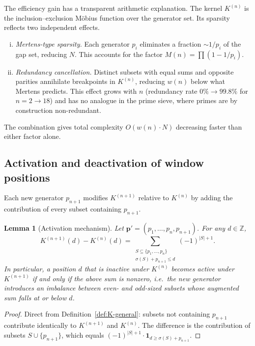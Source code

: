 \documentclass[11pt,a4paper]{amsart}
\theoremstyle{plain}
\newtheorem{lemma}[theorem]{Lemma}
\theoremstyle{definition}
\theoremstyle{remark}
\begin{document}
The efficiency gain has a transparent arithmetic explanation.
The kernel $K^{(n)}$ is the inclusion--exclusion M\"{o}bius function
over the generator set. Its sparsity reflects two independent effects.

\begin{enumerate}[(i)]
\item \emph{Mertens-type sparsity.} Each generator $p_i$ eliminates
a fraction $\sim 1/p_i$ of the gap set, reducing $N$.
This accounts for the factor $M(n) = \prod(1 - 1/p_i)$.

\item \emph{Redundancy cancellation.} Distinct subsets with equal sums
and opposite parities annihilate breakpoints in $K^{(n)}$,
reducing $w(n)$ below what Mertens predicts. This effect grows
with $n$ (redundancy rate $0\% \to 99.8\%$ for $n = 2 \to 18$)
and has no analogue in the prime sieve, where primes are by
construction non-redundant.
\end{enumerate}

The combination gives total complexity $O(w(n) \cdot N)$ decreasing
faster than either factor alone.

\subsection{Activation and deactivation of window positions}

Each new generator $p_{n+1}$ modifies $K^{(n+1)}$ relative to $K^{(n)}$
by adding the contribution of every subset containing $p_{n+1}$.

\begin{lemma}[Activation mechanism]
\label{lem:activation}
Let $\mathbf{p}' = (p_1,\ldots,p_n,p_{n+1})$.
For any $d \in \mathbb{Z}$,
\[
  K^{(n+1)}(d) - K^{(n)}(d)
  = \sum_{\substack{S \subseteq \{p_1,\ldots,p_n\} \\ \sigma(S) + p_{n+1} \leq d}}
    (-1)^{|S|+1}.
\]
In particular, a position $d$ that is inactive under $K^{(n)}$ becomes
active under $K^{(n+1)}$ if and only if the above sum is nonzero,
i.e.\ the new generator introduces an imbalance between even- and
odd-sized subsets whose augmented sum falls at or below $d$.
\end{lemma}

\begin{proof}
Direct from Definition~\ref{def:K-general}: subsets not containing
$p_{n+1}$ contribute identically to $K^{(n+1)}$ and $K^{(n)}$.
The difference is the contribution of subsets $S \cup \{p_{n+1}\}$,
which equals $(-1)^{|S|+1} \cdot \mathbf{1}_{d \geq \sigma(S) + p_{n+1}}$.
\end{proof}
\end{document}
